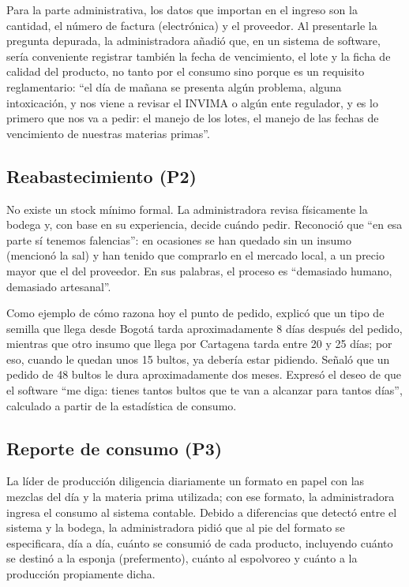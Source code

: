 Para la parte administrativa, los datos que importan en el ingreso son la cantidad, el número de factura (electrónica) y el proveedor. Al presentarle la pregunta depurada, la administradora añadió que, en un sistema de software, sería conveniente registrar también la fecha de vencimiento, el lote y la ficha de calidad del producto, no tanto por el consumo sino porque es un requisito reglamentario: ``el día de mañana se presenta algún problema, alguna intoxicación, y nos viene a revisar el INVIMA o algún ente regulador, y es lo primero que nos va a pedir: el manejo de los lotes, el manejo de las fechas de vencimiento de nuestras materias primas''.

\subsection{Reabastecimiento (P2)}

No existe un stock mínimo formal. La administradora revisa físicamente la bodega y, con base en su experiencia, decide cuándo pedir. Reconoció que ``en esa parte sí tenemos falencias'': en ocasiones se han quedado sin un insumo (mencionó la sal) y han tenido que comprarlo en el mercado local, a un precio mayor que el del proveedor. En sus palabras, el proceso es ``demasiado humano, demasiado artesanal''.

Como ejemplo de cómo razona hoy el punto de pedido, explicó que un tipo de semilla que llega desde Bogotá tarda aproximadamente 8 días después del pedido, mientras que otro insumo que llega por Cartagena tarda entre 20 y 25 días; por eso, cuando le quedan unos 15 bultos, ya debería estar pidiendo. Señaló que un pedido de 48 bultos le dura aproximadamente dos meses. Expresó el deseo de que el software ``me diga: tienes tantos bultos que te van a alcanzar para tantos días'', calculado a partir de la estadística de consumo.

\subsection{Reporte de consumo (P3)}

La líder de producción diligencia diariamente un formato en papel con las mezclas del día y la materia prima utilizada; con ese formato, la administradora ingresa el consumo al sistema contable. Debido a diferencias que detectó entre el sistema y la bodega, la administradora pidió que al pie del formato se especificara, día a día, cuánto se consumió de cada producto, incluyendo cuánto se destinó a la esponja (prefermento), cuánto al espolvoreo y cuánto a la producción propiamente dicha.


